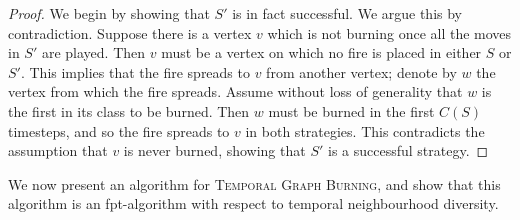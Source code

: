 \documentclass[preprint,12pt]{elsarticle}
\begin{document}
\begin{proof}
    We begin by showing that $S'$ is in fact successful. We argue this by contradiction. Suppose there is a vertex $v$ which is not burning once all the moves in $S'$ are played. Then $v$ must be a vertex on which no fire is placed in either $S$ or $S'$. This implies that the fire spreads to $v$ from another vertex; denote by $w$ the vertex from which the fire spreads. Assume without loss of generality that $w$ is the first in its class to be burned. Then $w$ must be burned in the first $C(S)$ timesteps, and so the fire spreads to $v$ in both strategies. This contradicts the assumption that $v$ is never burned, showing that $S'$ is a successful strategy.





\end{proof}

We now present an algorithm for \textsc{Temporal Graph Burning}, and show that this algorithm is an fpt-algorithm with respect to temporal neighbourhood diversity.
\end{document}
